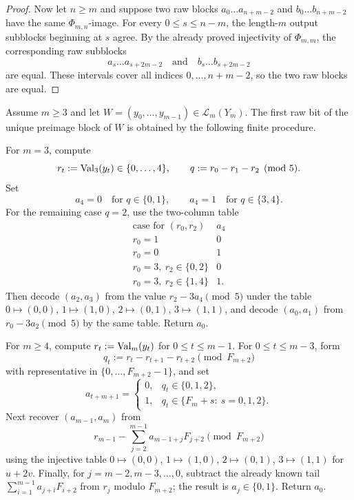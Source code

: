 \begin{proof}
Now let $n\ge m$ and suppose two raw blocks
$a_0\ldots a_{n+m-2}$ and $b_0\ldots b_{n+m-2}$ have the same
$\Phi_{m,n}$-image.  For every $0\le s\le n-m$, the length-$m$ output
subblocks beginning at $s$ agree.  By the already proved injectivity of
$\Phi_{m,m}$, the corresponding raw subblocks
\[
a_s\ldots a_{s+2m-2}
\quad\text{and}\quad
b_s\ldots b_{s+2m-2}
\]
are equal.  These intervals cover all indices $0,\ldots,n+m-2$, so the two
raw blocks are equal.
\end{proof}

\begin{corollary}\label{cor:residue-decoder-algorithm}
Assume $m\ge3$ and let
$W=(y_0,\ldots,y_{m-1})\in\mathcal L_m(Y_m)$. The first raw bit of the unique
preimage block of $W$ is obtained by the following finite procedure.

For $m=3$, compute
\[
r_t:=\mathrm{Val}_3(y_t)\in\{0,\ldots,4\},\qquad
q:=r_0-r_1-r_2\pmod 5.
\]
Set
\[
a_4=0\quad\text{for }q\in\{0,1\},\qquad
a_4=1\quad\text{for }q\in\{3,4\}.
\]
For the remaining case $q=2$, use the two-column table
\[
\begin{array}{c|c}
\text{case for }(r_0,r_2) & a_4\\
\hline
r_0=1 & 0\\
r_0=0 & 1\\
r_0=3,\ r_2\in\{0,2\} & 0\\
r_0=3,\ r_2\in\{1,4\} & 1 .
\end{array}
\]
Then decode $(a_2,a_3)$ from the value
$r_2-3a_4\pmod 5$ under the table
$0\mapsto(0,0)$, $1\mapsto(1,0)$, $2\mapsto(0,1)$,
$3\mapsto(1,1)$, and decode $(a_0,a_1)$ from
$r_0-3a_2\pmod 5$ by the same table. Return $a_0$.

For $m\ge4$, compute $r_t:=\mathrm{Val}_m(y_t)$ for $0\le t\le m-1$. For
$0\le t\le m-3$, form
\[
q_t:=r_t-r_{t+1}-r_{t+2}\pmod {F_{m+2}}
\]
with representative in $\{0,\ldots,F_{m+2}-1\}$, and set
\[
a_{t+m+1}=
\begin{cases}
0, & q_t\in\{0,1,2\},\\
1, & q_t\in\{F_m+s:\ s=0,1,2\}.
\end{cases}
\]
Next recover $(a_{m-1},a_m)$ from
\[
r_{m-1}-\sum_{j=2}^{m-1}a_{m-1+j}F_{j+2}\pmod {F_{m+2}}
\]
using the injective table $0\mapsto(0,0)$, $1\mapsto(1,0)$,
$2\mapsto(0,1)$, $3\mapsto(1,1)$ for $u+2v$. Finally, for
$j=m-2,m-3,\ldots,0$, subtract the already known tail
$\sum_{i=1}^{m-1}a_{j+i}F_{i+2}$ from $r_j$ modulo $F_{m+2}$; the result is
$a_j\in\{0,1\}$. Return $a_0$.
\end{corollary}

